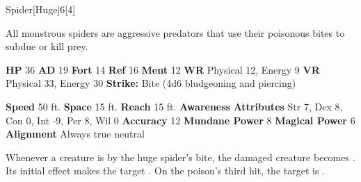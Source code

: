   \begin{monsection}{Spider}[Huge]{6}[4]
    \vspace{-1em}\vspace{-1em}
    \vspace{0em}

    
    All monstrous spiders are aggressive predators that use their poisonous bites to subdue or kill prey.
  
    

    \begin{spellcontent}
      \begin{spelltargetinginfo}
        \pari \textbf{HP} 36 \monsep
          \textbf{AD} 19 \monsep
          \textbf{Fort} 14 \monsep
          \textbf{Ref} 16 \monsep
          \textbf{Ment} 12
        \pari \textbf{WR} Physical 12, Energy 9 \monsep
        \textbf{VR} Physical 33, Energy 30
        \pari \textbf{Strike:}
            Bite  (4d6 bludgeoning and piercing)
      \end{spelltargetinginfo}
    \end{spellcontent}
    \begin{monsterfooter}
      \pari \textbf{Speed} 50 ft. \monsep
        \textbf{Space} 15 ft. \monsep
        \textbf{Reach} 15 ft.
      \pari \textbf{Awareness} 
      \pari \textbf{Attributes}
        Str 7, Dex 8,
        Con 0, Int -9,
        Per 8, Wil 0
      \pari \textbf{Accuracy} 12 \monsep
        \textbf{Mundane Power} 8 \monsep
      \textbf{Magical Power} 6
      \pari \textbf{Alignment} Always true neutral
    \end{monsterfooter}
  \end{monsection}
    Whenever a creature is  by the huge spider's bite,
      the damaged creature becomes .
    Its initial effect makes the target .
    On the poison's third hit, the target is .
  
